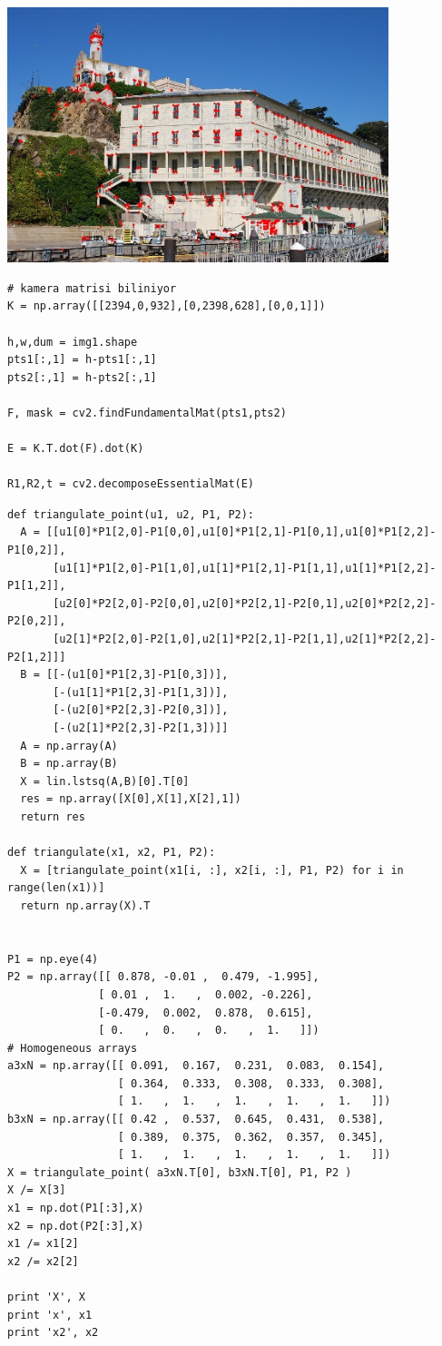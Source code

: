 \documentclass[12pt,fleqn]{article}\usepackage{../../common}
\begin{document}
\includegraphics[width=30em]{vision_20recons_02.jpg}


\begin{verbatim}
# kamera matrisi biliniyor
K = np.array([[2394,0,932],[0,2398,628],[0,0,1]])

h,w,dum = img1.shape
pts1[:,1] = h-pts1[:,1]
pts2[:,1] = h-pts2[:,1]

F, mask = cv2.findFundamentalMat(pts1,pts2)

E = K.T.dot(F).dot(K)

R1,R2,t = cv2.decomposeEssentialMat(E)
\end{verbatim}


\begin{verbatim}
def triangulate_point(u1, u2, P1, P2):
  A = [[u1[0]*P1[2,0]-P1[0,0],u1[0]*P1[2,1]-P1[0,1],u1[0]*P1[2,2]-P1[0,2]],
       [u1[1]*P1[2,0]-P1[1,0],u1[1]*P1[2,1]-P1[1,1],u1[1]*P1[2,2]-P1[1,2]],
       [u2[0]*P2[2,0]-P2[0,0],u2[0]*P2[2,1]-P2[0,1],u2[0]*P2[2,2]-P2[0,2]],
       [u2[1]*P2[2,0]-P2[1,0],u2[1]*P2[2,1]-P2[1,1],u2[1]*P2[2,2]-P2[1,2]]]
  B = [[-(u1[0]*P1[2,3]-P1[0,3])],
       [-(u1[1]*P1[2,3]-P1[1,3])],
       [-(u2[0]*P2[2,3]-P2[0,3])],
       [-(u2[1]*P2[2,3]-P2[1,3])]]
  A = np.array(A)
  B = np.array(B)
  X = lin.lstsq(A,B)[0].T[0]
  res = np.array([X[0],X[1],X[2],1])
  return res

def triangulate(x1, x2, P1, P2):
  X = [triangulate_point(x1[i, :], x2[i, :], P1, P2) for i in range(len(x1))]
  return np.array(X).T


P1 = np.eye(4)
P2 = np.array([[ 0.878, -0.01 ,  0.479, -1.995],
              [ 0.01 ,  1.   ,  0.002, -0.226],
              [-0.479,  0.002,  0.878,  0.615],
              [ 0.   ,  0.   ,  0.   ,  1.   ]])
# Homogeneous arrays
a3xN = np.array([[ 0.091,  0.167,  0.231,  0.083,  0.154],
                 [ 0.364,  0.333,  0.308,  0.333,  0.308],
                 [ 1.   ,  1.   ,  1.   ,  1.   ,  1.   ]])
b3xN = np.array([[ 0.42 ,  0.537,  0.645,  0.431,  0.538],
                 [ 0.389,  0.375,  0.362,  0.357,  0.345],
                 [ 1.   ,  1.   ,  1.   ,  1.   ,  1.   ]])
X = triangulate_point( a3xN.T[0], b3xN.T[0], P1, P2 )
X /= X[3]
x1 = np.dot(P1[:3],X)
x2 = np.dot(P2[:3],X)
x1 /= x1[2]
x2 /= x2[2]
 
print 'X', X
print 'x', x1
print 'x2', x2
\end{verbatim}
\end{document}
